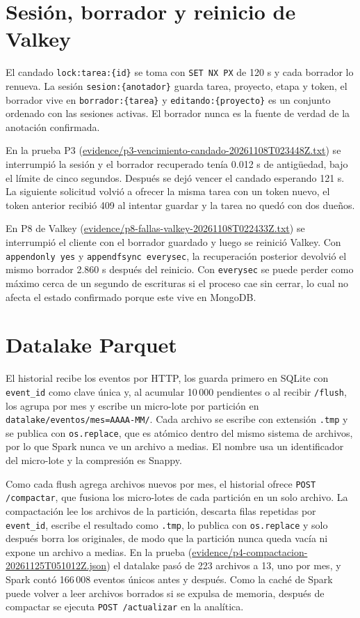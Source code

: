 \documentclass[conference]{IEEEtran}
\begin{document}
\section{Sesión, borrador y reinicio de Valkey}

El candado \texttt{lock:tarea:\{id\}} se toma con \texttt{SET NX PX} de 120 s y cada borrador lo renueva. La sesión \texttt{sesion:\{anotador\}} guarda tarea, proyecto, etapa y token, el borrador vive en \texttt{borrador:\{tarea\}} y \texttt{editando:\{proyecto\}} es un conjunto ordenado con las sesiones activas. El borrador nunca es la fuente de verdad de la anotación confirmada.

En la prueba P3 (\url{evidence/p3-vencimiento-candado-20261108T023448Z.txt}) se interrumpió la sesión y el borrador recuperado tenía 0.012 s de antigüedad, bajo el límite de cinco segundos. Después se dejó vencer el candado esperando 121 s. La siguiente solicitud volvió a ofrecer la misma tarea con un token nuevo, el token anterior recibió 409 al intentar guardar y la tarea no quedó con dos dueños.

En P8 de Valkey (\url{evidence/p8-fallas-valkey-20261108T022433Z.txt}) se interrumpió el cliente con el borrador guardado y luego se reinició Valkey. Con \texttt{appendonly yes} y \texttt{appendfsync everysec}, la recuperación posterior devolvió el mismo borrador 2.860 s después del reinicio. Con \texttt{everysec} se puede perder como máximo cerca de un segundo de escrituras si el proceso cae sin cerrar, lo cual no afecta el estado confirmado porque este vive en MongoDB.

\section{Datalake Parquet}

El historial recibe los eventos por HTTP, los guarda primero en SQLite con \texttt{event\_id} como clave única y, al acumular 10\,000 pendientes o al recibir \texttt{/flush}, los agrupa por mes y escribe un micro-lote por partición en \texttt{datalake/eventos/mes=AAAA-MM/}. Cada archivo se escribe con extensión \texttt{.tmp} y se publica con \texttt{os.replace}, que es atómico dentro del mismo sistema de archivos, por lo que Spark nunca ve un archivo a medias. El nombre usa un identificador del micro-lote y la compresión es Snappy.

Como cada flush agrega archivos nuevos por mes, el historial ofrece \texttt{POST /compactar}, que fusiona los micro-lotes de cada partición en un solo archivo. La compactación lee los archivos de la partición, descarta filas repetidas por \texttt{event\_id}, escribe el resultado como \texttt{.tmp}, lo publica con \texttt{os.replace} y solo después borra los originales, de modo que la partición nunca queda vacía ni expone un archivo a medias. En la prueba (\url{evidence/p4-compactacion-20261125T051012Z.json}) el datalake pasó de 223 archivos a 13, uno por mes, y Spark contó 166\,008 eventos únicos antes y después. Como la caché de Spark puede volver a leer archivos borrados si se expulsa de memoria, después de compactar se ejecuta \texttt{POST /actualizar} en la analítica.
\end{document}
